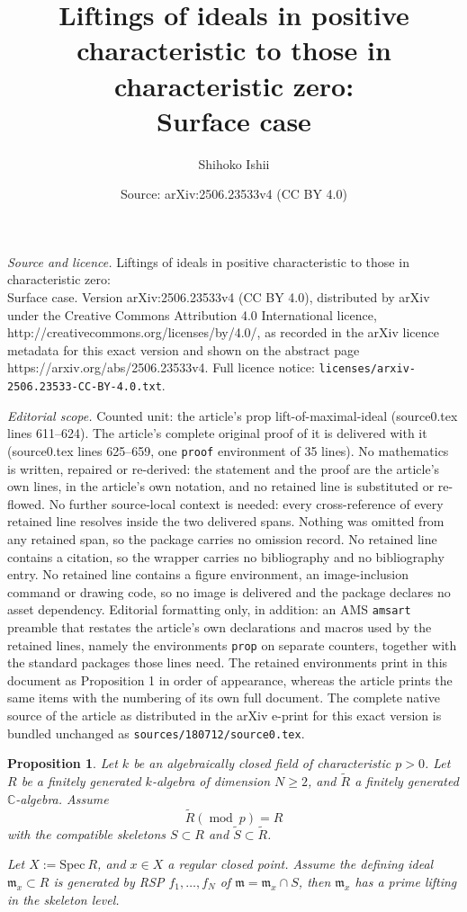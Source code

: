 \documentclass[10pt,a4paper]{amsart}
\title{Liftings of ideals in positive characteristic to those in characteristic zero: \\ Surface case}
\author{Shihoko Ishii}
\date{Source: arXiv:2506.23533v4 (CC BY 4.0)}
\newtheorem{prop}{Proposition}
\def\CC{{\mathbb{C}}}
\newcommand{\m}{{\mathfrak{m}}}
\renewcommand{\mod}{{\operatorname{mod}\ }}
\newcommand{\spec}{{\mathrm{Spec \ }}}
\renewcommand{\wr}{{\widetilde R}}
\newcommand{\ws}{{\widetilde{S}}}
\begin{document}
\maketitle

\noindent\emph{Source and licence.} Liftings of ideals in positive characteristic to those in characteristic zero: \\ Surface case. Version arXiv:2506.23533v4 (CC BY 4.0), distributed by arXiv under the Creative Commons Attribution 4.0 International licence, http://creativecommons.org/licenses/by/4.0/, as recorded in the arXiv licence metadata for this exact version and shown on the abstract page https://arxiv.org/abs/2506.23533v4. Full licence notice: \texttt{licenses/arxiv-2506.23533-CC-BY-4.0.txt}.\par\smallskip

\noindent\textit{Editorial scope.} Counted unit: the article's prop lift-of-maximal-ideal (source0.tex lines 611--624). The article's complete original proof of it is delivered with it (source0.tex lines 625--659, one \texttt{proof} environment of 35 lines). No mathematics is written, repaired or re-derived: the statement and the proof are the article's own lines, in the article's own notation, and no retained line is substituted or re-flowed.  No further source-local context is needed: every cross-reference of every retained line resolves inside the two delivered spans.  Nothing was omitted from any retained span, so the package carries no omission record.  No retained line contains a citation, so the wrapper carries no bibliography and no bibliography entry.  No retained line contains a figure environment, an image-inclusion command or drawing code, so no image is delivered and the package declares no asset dependency.  Editorial formatting only, in addition: an AMS \texttt{amsart} preamble that restates the article's own declarations and macros used by the retained lines, namely the environments \texttt{prop} on separate counters, together with the standard packages those lines need.  The retained environments print in this document as Proposition 1 in order of appearance, whereas the article prints the same items with the numbering of its own full document.  The complete native source of the article as distributed in the arXiv e-print for this exact version is bundled unchanged as \texttt{sources/180712/source0.tex}.
\begin{prop}\label{lift-of-maximal-ideal}
Let $k$ be an algebraically closed field of characteristic $p>0$.
      Let $R$ be a finitely generated $k$-algebra of dimension $N\geq2$, and 
      $\wr$ a finitely generated $\CC$-algebra.
        Assume 
        $$\wr (\mod p)=R$$
         with the compatible skeletons $S\subset R$ and $\ws\subset \wr$.
         
   Let $X:=\spec R$,  and $x\in X$ a regular closed point.
   Assume 
   the defining ideal $\m_x\subset R$ is generated by RSP $f_1,\ldots,f_N $ of $\m=\m_x\cap S$,
   then $\m_x$
   has a prime lifting in the skeleton level.
\end{prop}
\end{document}
